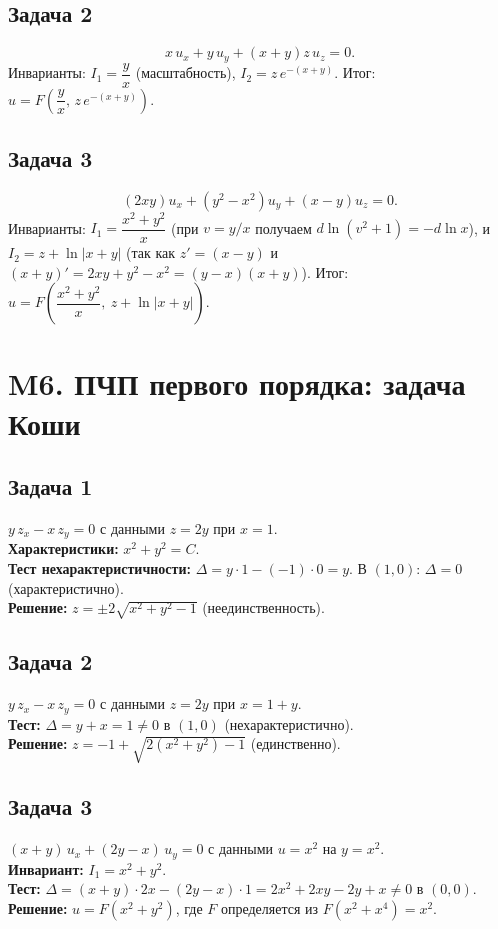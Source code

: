 \documentclass[12pt]{article}
\begin{document}
\subsection*{Задача 2}
\[
x\,u_x+y\,u_y+(x+y)z\,u_z=0.
\]
Инварианты: \(I_1=\dfrac{y}{x}\) (масштабность), \(I_2=z\,e^{-(x+y)}\).
Итог: \(u=F\!\left(\dfrac{y}{x},\,z\,e^{-(x+y)}\right)\).

\subsection*{Задача 3}
\[
(2xy)u_x+(y^2-x^2)u_y+(x-y)u_z=0.
\]
Инварианты: \(I_1=\dfrac{x^2+y^2}{x}\) (при $v=y/x$ получаем $d\ln(v^2+1)=-d\ln x$),
и \(I_2=z+\ln|x+y|\) (так как $z'=(x-y)$ и $(x+y)'=2xy+y^2-x^2=(y-x)(x+y)$).
Итог: \(u=F\!\left(\dfrac{x^2+y^2}{x},\ z+\ln|x+y|\right)\).

\section*{M6. ПЧП первого порядка: задача Коши}

\subsection*{Задача 1}
$y\,z_x - x\,z_y = 0$ с данными $z = 2y$ при $x = 1$. \\
\textbf{Характеристики: } $x^2+y^2=C$. \\
\textbf{Тест нехарактеристичности: } $\Delta = y \cdot 1 - (-1) \cdot 0 = y$. В $(1,0)$: $\Delta=0$ (характеристично). \\
\textbf{Решение: } $z = \pm 2\sqrt{x^2+y^2-1}$ (неединственность).

\subsection*{Задача 2}
$y\,z_x - x\,z_y = 0$ с данными $z = 2y$ при $x = 1+y$. \\
\textbf{Тест: } $\Delta = y + x = 1 \neq 0$ в $(1,0)$ (нехарактеристично). \\
\textbf{Решение: } $z = -1 + \sqrt{2(x^2+y^2)-1}$ (единственно).

\subsection*{Задача 3}
$(x+y)\,u_x + (2y-x)\,u_y = 0$ с данными $u = x^2$ на $y = x^2$. \\
\textbf{Инвариант: } $I_1 = x^2+y^2$. \\
\textbf{Тест: } $\Delta = (x+y) \cdot 2x - (2y-x) \cdot 1 = 2x^2+2xy-2y+x \neq 0$ в $(0,0)$. \\
\textbf{Решение: } $u = F(x^2+y^2)$, где $F$ определяется из $F(x^2+x^4) = x^2$.
\end{document}
